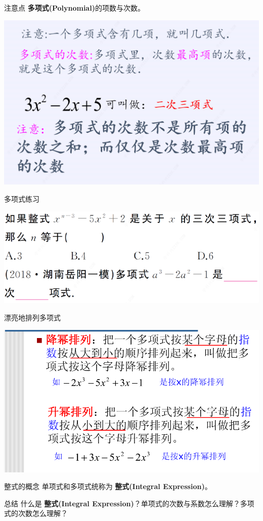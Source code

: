 \documentclass{beamer}
\begin{document}
	\begin{frame}{注意点}
		\textbf{多项式(Polynomial)}的项数与次数。
		
		\vspace{3ex}
		\includegraphics[width = .8\textwidth]{assets/polynomial attention.png}
	\end{frame}
	
	\begin{frame}{多项式练习}
		
		\includegraphics[width = .8\textwidth]{assets/polynomial practice.png}
	\end{frame}
	
	\begin{frame}{漂亮地排列多项式}
		
		\includegraphics[width = .99\textwidth]{assets/polynomial 2.png}
	\end{frame}
	
	\begin{frame}{整式的概念}
		单项式和多项式统称为 \textbf{整式(Integral Expression)}。
	\end{frame}
	
	\begin{frame}{总结}
		什么是 \textbf{整式(Integral Expression)}？单项式的次数与系数怎么理解？多项式的次数怎么理解？
	\end{frame}
\end{document}
